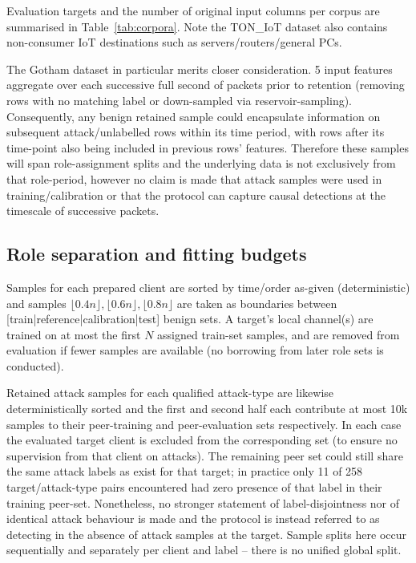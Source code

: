  

Evaluation targets and the number of original input columns per corpus are summarised in Table~\ref{tab:corpora}. Note the TON\_IoT dataset also contains non-consumer IoT destinations such as servers/routers/general PCs. 

The Gotham dataset in particular merits closer consideration. 5 input features aggregate over each successive full second of packets prior to retention (removing rows with no matching label or down-sampled via reservoir-sampling). Consequently, any benign retained sample could encapsulate information on subsequent attack/unlabelled rows within its time period, with rows after its time-point also being included in previous rows' features. Therefore these samples will span role-assignment splits and the underlying data is not exclusively from that role-period, however no claim is made that attack samples were used in training/calibration or that the protocol can capture causal detections at the timescale of successive packets.

\subsection{Role separation and fitting budgets} 
Samples for each prepared client are sorted by time/order as-given (deterministic) and samples $\lfloor 0.4n\rfloor, \lfloor 0.6n\rfloor, \lfloor 0.8n\rfloor$ are taken as boundaries between [train|reference|calibration|test] benign sets. A target's local channel(s) are trained on at most the first $N$ assigned train-set samples, and are removed from evaluation if fewer samples are available (no borrowing from later role sets is conducted).

Retained attack samples for each qualified attack-type are likewise deterministically sorted and the first and second half each contribute at most 10k samples to their peer-training and peer-evaluation sets respectively. In each case the evaluated target client is excluded from the corresponding set (to ensure no supervision from that client on attacks). The remaining peer set could still share the same attack labels as exist for that target; in practice only 11 of 258 target/attack-type pairs encountered had zero presence of that label in their training peer-set. Nonetheless, no stronger statement of label-disjointness nor of identical attack behaviour is made and the protocol is instead referred to as detecting in the absence of attack samples at the target. Sample splits here occur sequentially and separately per client and label -- there is no unified global split.

